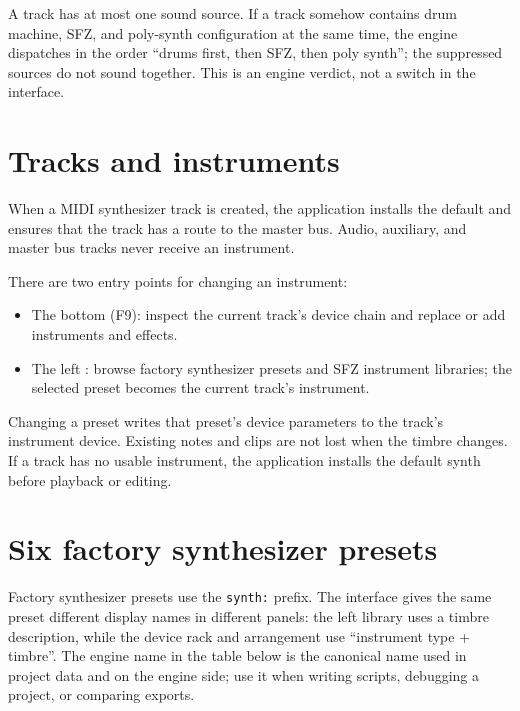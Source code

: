 A track has at most one sound source. If a track somehow contains drum machine,
SFZ, and poly-synth configuration at the same time, the engine dispatches in the
order ``drums first, then SFZ, then poly synth''; the suppressed sources do not
sound together. This is an engine verdict, not a switch in the interface.

\section{Tracks and instruments}

When a MIDI synthesizer track is created, the application installs the default
 and ensures that the track has a route to the master bus.
Audio, auxiliary, and master bus tracks never receive an instrument.

There are two entry points for changing an instrument:

\begin{itemize}
  \item The bottom  (F9): inspect the current track's device
        chain and replace or add instruments and effects.
  \item The left : browse factory synthesizer presets and
        SFZ instrument libraries; the selected preset becomes the current track's
        instrument.
\end{itemize}

Changing a preset writes that preset's device parameters to the track's
instrument device. Existing notes and clips are not lost when the timbre changes.
If a track has no usable instrument, the application installs the default synth
before playback or editing.


\section{Six factory synthesizer presets}

Factory synthesizer presets use the \texttt{synth:} prefix. The interface gives
the same preset different display names in different panels: the left library
uses a timbre description, while the device rack and arrangement use
``instrument type + timbre''. The engine name in the table below is the canonical
name used in project data and on the engine side; use it when writing scripts,
debugging a project, or comparing exports.

